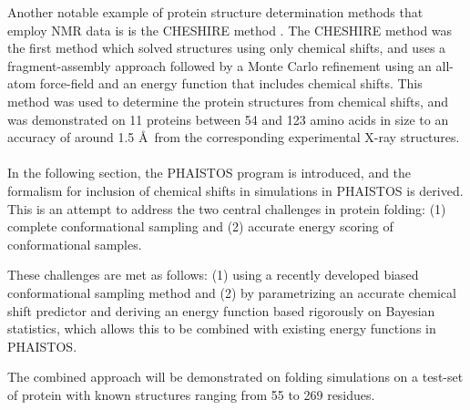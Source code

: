 Another notable example of protein structure determination methods that employ NMR data is is the CHESHIRE method \cite{cheshire}.
The CHESHIRE method was the first method which solved structures using only chemical shifts, and uses a fragment-assembly approach followed by a Monte Carlo refinement using an all-atom force-field and an energy function that includes chemical shifts.
This method was used to determine the protein structures from chemical shifts, and was demonstrated on 11 proteins between 54 and 123 amino acids in size to an accuracy of around 1.5 \AA~from the corresponding experimental X-ray structures.
\\\\
In the following section, the PHAISTOS program is introduced, and the formalism for inclusion of chemical shifts in simulations in PHAISTOS is derived.
This is an attempt to address the two central challenges in protein folding: (1) complete conformational sampling and (2) accurate energy scoring of conformational samples.

These challenges are met as follows: (1) using a recently developed biased conformational sampling method and (2) by parametrizing an accurate chemical shift predictor and deriving an energy function based rigorously on Bayesian statistics, which allows this to be combined with existing energy functions in PHAISTOS.

The combined approach will be demonstrated on folding simulations on a test-set of protein with known structures ranging from 55 to 269 residues.

